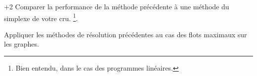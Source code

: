 \documentclass[11pt, a4paper]{article}
\begin{document}
\begin{question}{+2}
  Comparer la performance de la méthode précédente à une méthode du
  simplexe de votre cru. \footnote{Bien entendu, dans le cas des
    programmes linéaires.}.
\end{question}

\begin{question}
  Appliquer les méthodes de résolution précédentes au cas des flots
  maximaux sur les graphes.
\end{question}




\end{document}
